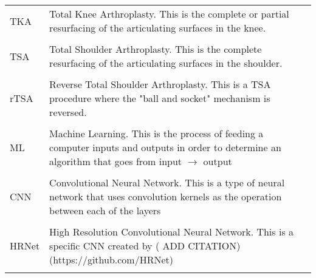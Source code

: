 \singlespacing
\begin{tabular}{l p{5in}} 
TKA & Total Knee Arthroplasty. This is the complete or partial resurfacing of the articulating surfaces in the knee.\\
\\
TSA & Total Shoulder Arthroplasty. This is the complete resurfacing of the articulating surfaces in the shoulder.\\
\\
rTSA & Reverse Total Shoulder Arthroplasty. This is a TSA procedure where the "ball and socket" mechanism is reversed.\\
\\
ML & Machine Learning. This is the process of feeding a computer inputs and outputs in order to determine an algorithm that goes from input $\longrightarrow$ output\\
\\
CNN & Convolutional Neural Network. This is a type of neural network that uses convolution kernels as the operation between each of the layers\\
\\
HRNet & High Resolution Convolutional Neural Network. This is a specific CNN created by ({\color{red} ADD CITATION}) (https://github.com/HRNet)\\
\\
\end{tabular}

\doublespacing
